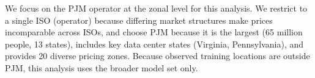 \documentclass[sigconf,authordraft]{acmart}
\begin{document}
We focus on the PJM operator at the zonal level for this analysis. We restrict to a single ISO (operator) because differing market structures make prices incomparable across ISOs, and choose PJM because it is the largest (65 million people, 13 states), includes key data center states (Virginia, Pennsylvania), and provides 20 diverse pricing zones. Because observed training locations are outside PJM, this analysis uses the broader model set only.

\end{document}
